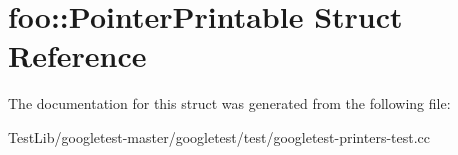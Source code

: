 \hypertarget{structfoo_1_1PointerPrintable}{}\section{foo\+:\+:Pointer\+Printable Struct Reference}
\label{structfoo_1_1PointerPrintable}


The documentation for this struct was generated from the following file\+:\begin{DoxyCompactItemize}
\item 
Test\+Lib/googletest-\/master/googletest/test/googletest-\/printers-\/test.\+cc\end{DoxyCompactItemize}
